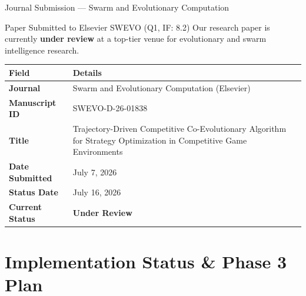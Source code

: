 \documentclass[aspectratio=169, 10pt]{beamer}
\begin{document}
\begin{frame}{Journal Submission --- Swarm and Evolutionary Computation}
\begin{block}{Paper Submitted to Elsevier SWEVO (Q1, IF: 8.2)}
Our research paper is currently \textbf{under review} at a top-tier venue for evolutionary and swarm intelligence research.
\end{block}
\vspace{0.2cm}\centering
\renewcommand{\arraystretch}{1.3}
\begin{tabular}{p{4.2cm}p{7.8cm}}
    \toprule
    \textbf{Field} & \textbf{Details}\\
    \midrule
    \textbf{Journal}       & Swarm and Evolutionary Computation (Elsevier)\\
    \textbf{Manuscript ID}  & SWEVO-D-26-01838\\
    \textbf{Title}          & Trajectory-Driven Competitive Co-Evolutionary Algorithm for Strategy Optimization in Competitive Game Environments\\
    \textbf{Date Submitted} & July 7, 2026\\
    \textbf{Status Date}    & July 16, 2026\\
    \textbf{Current Status} & \textcolor{progAmber}{\textbf{Under Review}}\\
    \bottomrule
\end{tabular}
\end{frame}

\section{Implementation Status \& Phase 3 Plan}
\end{document}
